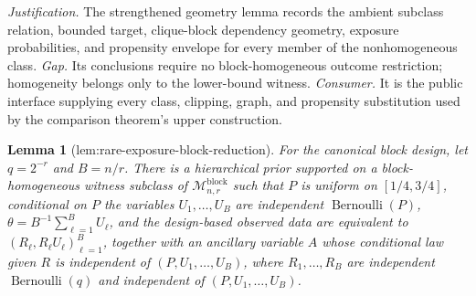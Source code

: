 \documentclass{article}
\newtheorem{lemma}{Lemma}
\begin{document}
\par\smallskip\noindent \textit{Justification.} The strengthened geometry lemma records the ambient subclass relation, bounded target, clique-block dependency geometry, exposure probabilities, and propensity envelope for every member of the nonhomogeneous class. \textit{Gap.} Its conclusions require no block-homogeneous outcome restriction; homogeneity belongs only to the lower-bound witness. \textit{Consumer.} It is the public interface supplying every class, clipping, graph, and propensity substitution used by the comparison theorem's upper construction.

\begin{lemma}[lem:rare-exposure-block-reduction]\label{lem:rare-exposure-block-reduction}
For the canonical block design, let \(q=2^{-r}\) and \(B=n/r\). There is a hierarchical prior supported on a block-homogeneous witness subclass of \(\mathcal M_{n,r}^{\mathrm{block}}\) such that \(P\) is uniform on \([1/4,3/4]\), conditional on \(P\) the variables \(U_1,\ldots,U_B\) are independent \(\operatorname{Bernoulli}(P)\), \(\theta=B^{-1}\sum_{\ell=1}^B U_\ell\), and the design-based observed data are equivalent to \((R_\ell,R_\ell U_\ell)_{\ell=1}^B\), together with an ancillary variable \(A\) whose conditional law given \(R\) is independent of \((P,U_1,\ldots,U_B)\), where \(R_1,\ldots,R_B\) are independent \(\operatorname{Bernoulli}(q)\) and independent of \((P,U_1,\ldots,U_B)\).
\end{lemma}
\end{document}
